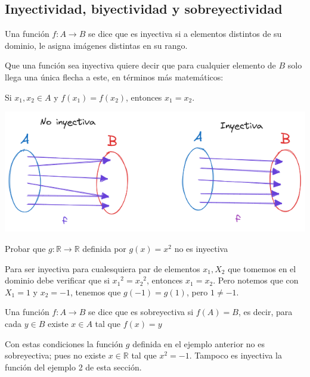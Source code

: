 \subsection{Inyectividad, biyectividad y sobreyectividad}

\begin{definicion}[Inyectividad]
Una función $f:A\to B$ se dice que es inyectiva si a elementos distintos de su dominio, le asigna imágenes distintas en su rango.
\end{definicion}

Que una función sea inyectiva quiere decir que para cualquier elemento de $B$ solo llega una única flecha a este, en términos más matemáticos:
\begin{center}
    Si $x_1, x_2 \in A$ y $f(x_1)=f(x_2)$, entonces $x_1=x_2$.
\end{center}

\begin{center}
    \includegraphics[scale=0.55]{Imagenes/IMG2/S1-2-03.png}
\end{center}

\begin{ejemplo}
Probar que $g : \mathbb{R} \to \mathbb{R}$ definida por $g (x) = x^2$ no es inyectiva
\end{ejemplo}

\begin{solucion}
Para ser inyectiva para cualesquiera par de elementos $x_1, X_2$ que tomemos en el dominio debe verificar que si ${x_1}^2={x_2}^2$, entonces $x_1=x_2$. Pero notemos que con $X_1=1$ y $x_2=-1$, tenemos que $g(-1)=g(1)$, pero $1 \neq -1$.    
\end{solucion}
    

\begin{definicion}[Sobreyectividad]
Una función $f:A\to B$ se dice que es sobreyectiva si $f(A)=B$, es decir, para cada $y\in B$ existe $x\in A$ tal que $f(x)=y$
\end{definicion}

Con estas condiciones la función $g$ definida en el ejemplo anterior no es sobreyectiva; pues no existe $x\in \mathbb{R}$ tal que $x^2=-1$. Tampoco es inyectiva la función del ejemplo 2 de esta sección.


